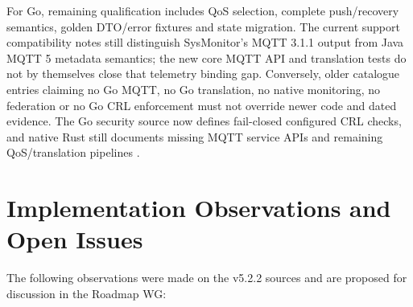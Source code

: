 \documentclass[a4paper]{arrowhead}
\begin{document}
For Go, remaining qualification includes QoS selection, complete push/recovery
semantics, golden DTO/error fixtures and state migration. The current support
compatibility notes still distinguish SysMonitor's MQTT 3.1.1 output from Java
MQTT 5 metadata semantics; the new core MQTT API and translation tests do not by
themselves close that telemetry binding gap. Conversely, older catalogue entries
claiming no Go MQTT, no Go translation, no native monitoring, no federation or
no Go CRL enforcement must not override newer code and dated evidence. The Go
security source now defines fail-closed configured CRL checks, and native Rust
still documents missing MQTT service APIs and remaining QoS/translation pipelines
\cite{nativeCompatibility20261024,goMqtt20261024,rustFederation20261019}.

\section{Implementation Observations and Open Issues}
\label{sec:issues}

The following observations were made on the v5.2.2 sources and are proposed for discussion in
the Roadmap WG:
\end{document}
